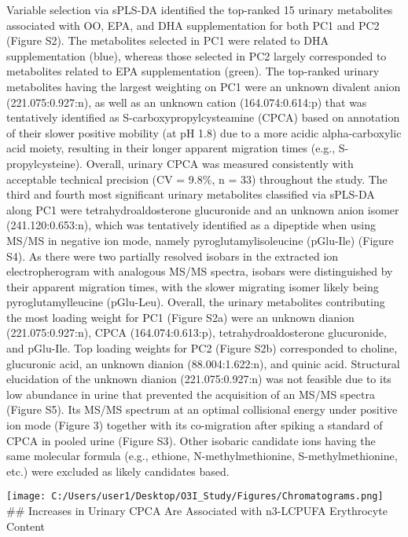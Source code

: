\documentclass[journal=jacsat,manuscript=article]{achemso}
\begin{document}
Variable selection via sPLS-DA identified the top-ranked 15 urinary
metabolites associated with OO, EPA, and DHA supplementation for both
PC1 and PC2 (Figure S2). The metabolites selected in PC1 were related to
DHA supplementation (blue), whereas those selected in PC2 largely
corresponded to metabolites related to EPA supplementation (green). The
top-ranked urinary metabolites having the largest weighting on PC1 were
an unknown divalent anion (221.075:0.927:n), as well as an unknown
cation (164.074:0.614:p) that was tentatively identified as
S-carboxypropylcysteamine (CPCA) based on annotation of their slower
positive mobility (at pH 1.8) due to a more acidic alpha-carboxylic acid
moiety, resulting in their longer apparent migration times (e.g.,
S-propylcysteine). Overall, urinary CPCA was measured consistently with
acceptable technical precision (CV = 9.8\%, n = 33) throughout the
study. The third and fourth most significant urinary metabolites
classified via sPLS-DA along PC1 were tetrahydroaldosterone glucuronide
and an unknown anion isomer (241.120:0.653:n), which was tentatively
identified as a dipeptide when using MS/MS in negative ion mode, namely
pyroglutamylisoleucine (pGlu-Ile) (Figure S4). As there were two
partially resolved isobars in the extracted ion electropherogram with
analogous MS/MS spectra, isobars were distinguished by their apparent
migration times, with the slower migrating isomer likely being
pyroglutamylleucine (pGlu-Leu). Overall, the urinary metabolites
contributing the most loading weight for PC1 (Figure S2a) were an
unknown dianion (221.075:0.927:n), CPCA (164.074:0.613:p),
tetrahydroaldosterone glucuronide, and pGlu-Ile. Top loading weights for
PC2 (Figure S2b) corresponded to choline, glucuronic acid, an unknown
dianion (88.004:1.622:n), and quinic acid. Structural elucidation of the
unknown dianion (221.075:0.927:n) was not feasible due to its low
abundance in urine that prevented the acquisition of an MS/MS spectra
(Figure S5). Its MS/MS spectrum at an optimal collisional energy under
positive ion mode (Figure 3) together with its co-migration after
spiking a standard of CPCA in pooled urine (Figure S3). Other isobaric
candidate ions having the same molecular formula (e.g., ethione,
N-methylmethionine, S-methylmethionine, etc.) were excluded as likely
candidates based.

\texttt{[image: C:/Users/user1/Desktop/O3I\_Study/Figures/Chromatograms.png]}
\#\# Increases in Urinary CPCA Are Associated with n3-LCPUFA Erythrocyte
Content
\end{document}

